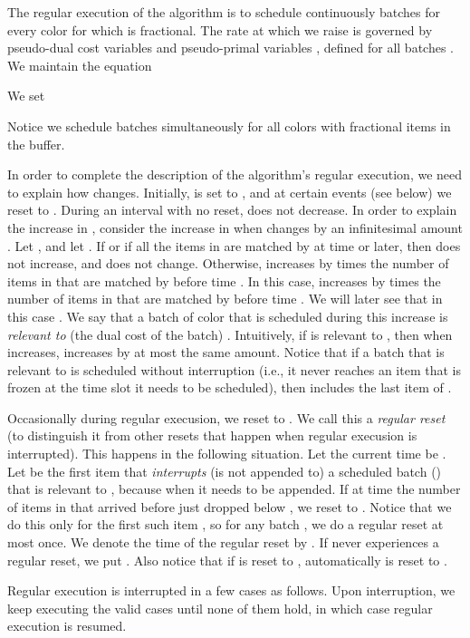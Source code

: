 \documentclass[12pt]{article}
\begin{document}
The regular execution of the algorithm is to schedule
continuously batches for every color  for which 
is fractional. The rate  at which we raise  is
governed by pseudo-dual cost variables 
and pseudo-primal variables , defined for all
batches . We maintain the equation

We set

Notice we schedule batches simultaneously for all colors with
fractional items in the buffer.

In order to complete the description of the algorithm's regular
execution, we need to explain how  changes.
Initially,  is set to , and at certain events
(see below) we reset  to . During an interval 
 with no reset,  does not
decrease. In order to explain the increase in ,
consider the increase in  when  changes by
an infinitesimal amount . Let , and let
. If  or
if all the items in  are matched by  at time 
or later, then  does not increase, and 
does not change. Otherwise,  increases by 
times the number of items in  that are matched by
 before time . In this case,  increases
by  times the number of items in  that
are matched by  before time . We will later see that
in this case .
We say that a batch  of color  that is scheduled during this 
increase is {\em relevant to} (the dual cost of the batch) .
Intuitively, if  is relevant to , then when  increases,
 increases by at most the same amount. Notice that
if a batch  that is relevant to  is scheduled without
interruption (i.e., it never reaches an item that is frozen at the
time slot it needs to be scheduled), then  includes the last
item of .

Occasionally during regular execusion, we reset  
to . We call this a {\em regular reset} (to distinguish it from
other resets that happen when regular execusion is interrupted).
This happens in the following situation. Let the current time 
be . Let  be the first item that {\em interrupts}
(is not appended to) a scheduled batch  ()
that is relevant to , because  when
it needs to be appended. If at time  the number of
items in  that arrived before  just dropped below
, we reset  to . Notice 
that we do this only for the first such item , so for
any batch , we do a regular reset at most once.
We denote the time of the regular reset by . 
If  never experiences a regular reset, we put 
.
Also notice that if  is reset to , 
automatically  is reset to .


Regular execution is interrupted in a few cases as follows. Upon
interruption, we keep executing the valid cases until none of them
hold, in which case regular execution is resumed.
\end{document}

